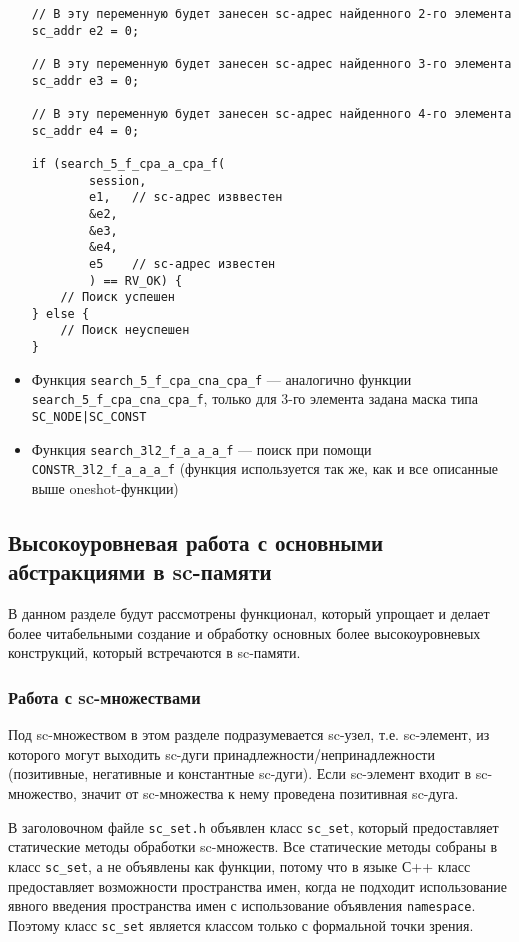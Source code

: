 \begin{itemize}
\begin{lstlisting}[texcl]
// В эту переменную будет занесен sc-адрес найденного 2-го элемента
sc_addr e2 = 0;

// В эту переменную будет занесен sc-адрес найденного 3-го элемента
sc_addr e3 = 0;

// В эту переменную будет занесен sc-адрес найденного 4-го элемента
sc_addr e4 = 0;

if (search_5_f_cpa_a_cpa_f(
        session,
        e1,   // sc-адрес изввестен
        &e2,
        &e3,
        &e4,
        e5    // sc-адрес известен
        ) == RV_OK) {
    // Поиск успешен
} else {
    // Поиск неуспешен
}
\end{lstlisting}

\item Функция \lstinline|search_5_f_cpa_сna_cpa_f| --- аналогично функции
  \lstinline|search_5_f_cpa_сna_cpa_f|, только для 3-го элемента
  задана маска типа \lstinline+SC_NODE|SC_CONST+

\item Функция \lstinline|search_3l2_f_a_a_a_f| --- поиск при помощи
  \lstinline|CONSTR_3l2_f_a_a_a_f| (функция используется так же, как и
  все описанные выше oneshot-функции)
\end{itemize}

\subsection{Высокоуровневая работа с основными абстракциями в sc-памяти}
\label{sec:libsc_high}

В данном разделе будут рассмотрены функционал, который упрощает и
делает более читабельными создание и обработку основных более
высокоуровневых конструкций, который встречаются в sc-памяти.

\subsubsection{Работа с sc-множествами}
\label{sec:libsc_sc_set}

Под sc-множеством в этом разделе подразумевается sc-узел,
т.е. sc-элемент, из которого могут выходить sc-дуги
принадлежности/непринадлежности (позитивные, негативные и константные
sc-дуги). Если sc-элемент входит в sc-множество, значит от
sc-множества к нему проведена позитивная sc-дуга.

В заголовочном файле \verb|sc_set.h| объявлен класс
\lstinline|sc_set|, который предоставляет статические методы обработки
sc-множеств. Все статические методы собраны в класс
\lstinline|sc_set|, а не объявлены как функции, потому что в языке С++
класс предоставляет возможности пространства имен, когда не подходит
использование явного введения пространства имен с использование
объявления \lstinline|namespace|. Поэтому класс \lstinline|sc_set|
является классом только с формальной точки зрения.

